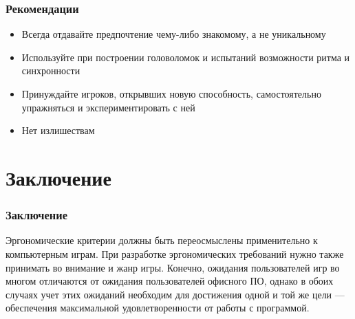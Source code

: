 \documentclass[10pt]{beamer}
\begin{document}
\begin{frame}
\frametitle{Рекомендации}

\begin{block}{}
  \begin{itemize}
    \item Всегда отдавайте предпочтение чему-либо знакомому, а не уникальному
    \item Используйте при построении головоломок и испытаний возможности ритма и синхронности
    \item Принуждайте игроков, открывших новую способность, самостоятельно упражняться и экспериментировать с ней
    \item Нет излишествам
  \end{itemize}
\end{block}

\end{frame}

\section{Заключение}
\begin{frame}
\frametitle{Заключение}

\begin{block}{}
  Эргономические критерии должны быть переосмыслены применительно к компьютерным играм. При разработке эргономических требований нужно также принимать во внимание и жанр игры. Конечно, ожидания пользователей игр во многом отличаются от ожидания пользователей офисного ПО, однако в обоих случаях учет этих ожиданий необходим для достижения одной и той же цели — обеспечения максимальной удовлетворенности от работы с программой.
\end{block}

\end{frame}
\end{document}
